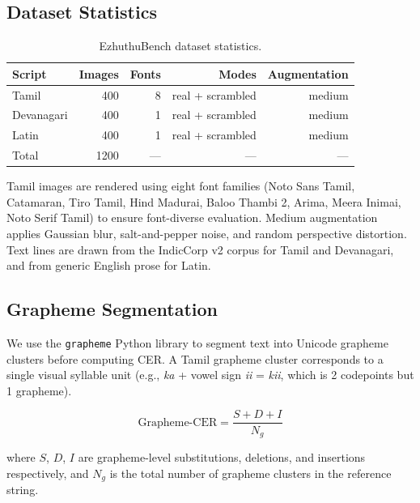 \documentclass[11pt,a4paper]{article}
\begin{document}
\subsection{Dataset Statistics}

\begin{table}[h]
\centering
\caption{EzhuthuBench dataset statistics.}
\label{tab:dataset}
\begin{tabular}{lrrrr}
\toprule
Script & Images & Fonts & Modes & Augmentation \\
\midrule
Tamil       & 400 & 8 & real + scrambled & medium \\
Devanagari  & 400 & 1 & real + scrambled & medium \\
Latin       & 400 & 1 & real + scrambled & medium \\
\midrule
Total       & 1200 & --- & --- & --- \\
\bottomrule
\end{tabular}
\end{table}

\noindent Tamil images are rendered using eight font families
(Noto Sans Tamil, Catamaran, Tiro Tamil, Hind Madurai, Baloo Thambi 2,
Arima, Meera Inimai, Noto Serif Tamil) to ensure font-diverse evaluation.
Medium augmentation applies Gaussian blur, salt-and-pepper noise, and
random perspective distortion.
Text lines are drawn from the IndicCorp v2 corpus \citep{kakwani2020indicnlpsuite}
for Tamil and Devanagari, and from generic English prose for Latin.

\subsection{Grapheme Segmentation}

We use the \texttt{grapheme} Python library to segment text into Unicode
grapheme clusters before computing CER.
A Tamil grapheme cluster corresponds to a single visual syllable unit
(e.g., \textit{ka} + vowel sign \textit{ii} = \textit{kii}, which is
2 codepoints but 1 grapheme).

\begin{equation}
\text{Grapheme-CER} = \frac{S + D + I}{N_g}
\end{equation}

\noindent where $S$, $D$, $I$ are grapheme-level substitutions, deletions,
and insertions respectively, and $N_g$ is the total number of grapheme
clusters in the reference string.

\end{document}
